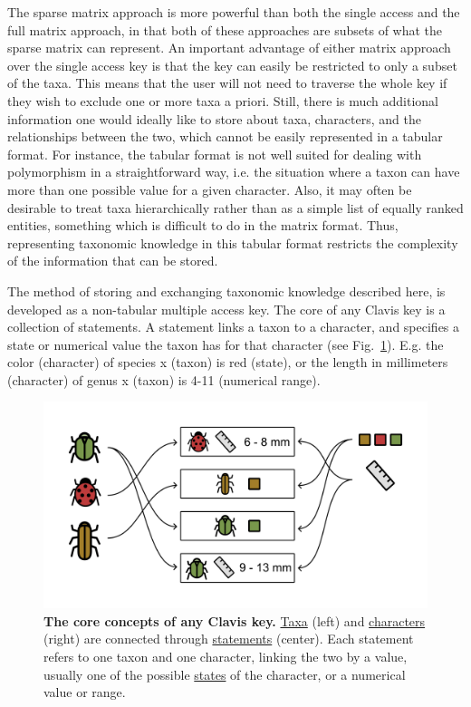 \documentclass[10pt,letterpaper]{article}
\begin{document}
The sparse matrix approach is more powerful than both the single access and the full matrix approach, in that both of these approaches are subsets of what the sparse matrix can represent. An important advantage of either matrix approach over the single access key is that the key can easily be restricted to only a subset of the taxa. This means that the user will not need to traverse the whole key if they wish to exclude one or more taxa a priori. Still, there is much additional information one would ideally like to store about taxa, characters, and the relationships between the two, which cannot be easily represented in a tabular format. For instance, the tabular format is not well suited for dealing with polymorphism in a straightforward way, i.e. the situation where a taxon can have more than one possible value for a given character. Also, it may often be desirable to treat taxa hierarchically rather than as a simple list of equally ranked entities, something which is difficult to do in the matrix format. Thus, representing taxonomic knowledge in this tabular format restricts the complexity of the information that can be stored.

The method of storing and exchanging taxonomic knowledge described here, is developed as a non-tabular multiple access key. The core of any Clavis key is a collection of statements. A statement links a taxon to a character, and specifies a state or numerical value the taxon has for that character (see Fig.~\ref{fig1}). E.g. the color (character) of species x (taxon) is red (state), or the length in millimeters (character) of genus x (taxon) is 4-11 (numerical range).




\begin{figure}[!h]
  \includegraphics[width=\textwidth]{Images/Fig1}
  \caption{{\bf The core concepts of any Clavis key.}
  \underline{Taxa} (left) and \underline{characters} (right) are connected through \underline{statements} (center). Each statement refers to one taxon and one character, linking the two by a value, usually one of the possible \underline{states} of the character, or a numerical value or range.}
  \label{fig1}
\end{figure}
\end{document}
